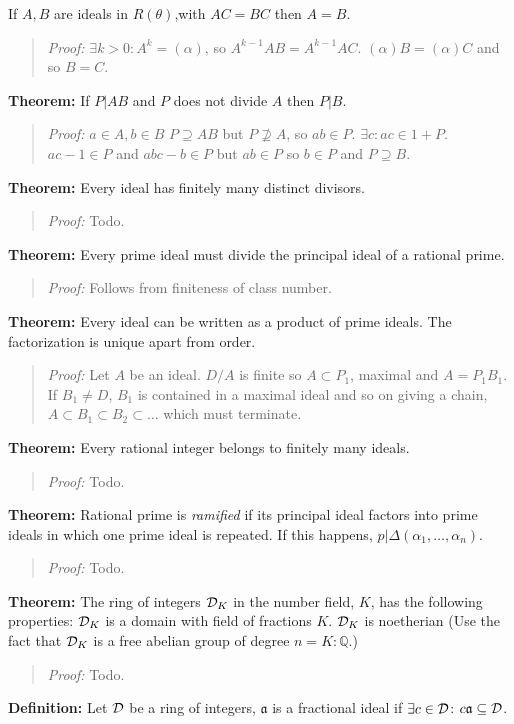If $A, B$ are ideals in $R(\theta)$,with  $AC=BC$ then $A=B$.
\begin{quote}
\emph{Proof:} $\exists k>0: A^k= (\alpha)$, so
$A^{k-1}AB = A^{k-1} AC$.  $(\alpha) B = (\alpha) C$ and so $B=C$.
\end{quote}
{\bf Theorem:}
If $P|AB$ and $P$ does not divide $A$ then $P|B$.
\begin{quote}
\emph{Proof:} $a \in A, b \in B$ $P \supseteq AB$ but $P \nsupseteq A$,
so $ab \in P$.  $\exists c: ac \in 1 +P$.  $ac - 1 \in P$ and
$abc - b \in P$ but $ab \in P$ so $b \in P$ and $P \supseteq B$.
\end{quote}
{\bf Theorem:}
Every ideal has finitely many distinct divisors.
\begin{quote}
\emph{Proof:} Todo.
\end{quote}
{\bf Theorem:}
Every prime ideal must divide the principal ideal of a rational prime.
\begin{quote}
\emph{Proof:} Follows from finiteness of class number.
\end{quote}
{\bf Theorem:}
Every ideal can be written as a product of prime ideals.  The factorization
is unique apart from order.
\begin{quote}
\emph{Proof:} Let $A$ be an ideal.  $D/A$ is finite so $A \subset P_1$, maximal and
$A= P_1B_1$.  If $B_1 \neq D$, $B_1$ is contained in a maximal ideal and so on
giving a chain, $A \subset B_1 \subset B_2 \subset \ldots$ which must terminate.
\end{quote}
{\bf Theorem:}
Every rational integer belongs to finitely many ideals.
\begin{quote}
\emph{Proof:} Todo.
\end{quote}
{\bf Theorem:}
Rational prime is \emph{ramified}
 if its principal ideal factors into prime ideals in which one
prime ideal is repeated.  If this happens, $p | \Delta(\alpha_1 , \ldots , \alpha_n)$.
\begin{quote}
\emph{Proof:} Todo.
\end{quote}
{\bf Theorem:}
The ring of integers ${\cal D}_K$ in the number field, $K$, has the following properties:
${\cal D}_K$ 
is a domain with field of fractions $K$.
${\cal D}_K$ is noetherian (Use the fact that
${\cal D}_K$  is a free abelian group of degree $n= K:{\mathbb Q}$.)
\begin{quote}
\emph{Proof:} Todo.
\end{quote}
{\bf Definition:}
Let ${\cal D}$ be a ring of integers, ${\mathfrak a}$
is a fractional ideal if $\exists c \in {\cal D}$: $c {\mathfrak a} \subseteq {\cal D}$.
